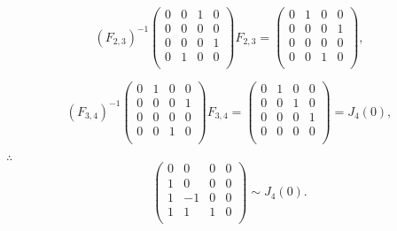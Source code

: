 \documentclass[color=black,device=normal,lang=cn,mode=geye]{elegantnote}
\begin{document}
\begin{solution}
    \[(F_{2,3})^{-1}\begin{pmatrix}
        0 & 0 & 1 & 0 \\
        0 & 0 & 0 & 0 \\
        0 & 0 & 0 & 1 \\
        0 & 1 & 0 & 0 \\
    \end{pmatrix}F_{2,3}=\begin{pmatrix}
        0 & 1 & 0 & 0 \\
        0 & 0 & 0 & 1 \\
        0 & 0 & 0 & 0 \\
        0 & 0 & 1 & 0 \\
    \end{pmatrix},\]

    \[(F_{3,4})^{-1}\begin{pmatrix}
        0 & 1 & 0 & 0 \\
        0 & 0 & 0 & 1 \\
        0 & 0 & 0 & 0 \\
        0 & 0 & 1 & 0 \\
    \end{pmatrix}F_{3,4}=\begin{pmatrix}
        0 & 1 & 0 & 0 \\
        0 & 0 & 1 & 0 \\
        0 & 0 & 0 & 1 \\
        0 & 0 & 0 & 0 \\
    \end{pmatrix}=J_4(0),\]
    
    $\therefore$
    \[\begin{pmatrix}
        0 & 0 & 0 & 0 \\
        1 & 0 & 0 & 0 \\
        1 & -1 & 0 & 0 \\
        1 & 1 & 1 & 0 \\
    \end{pmatrix}\sim J_4(0).\]


\end{solution}
\end{document}
